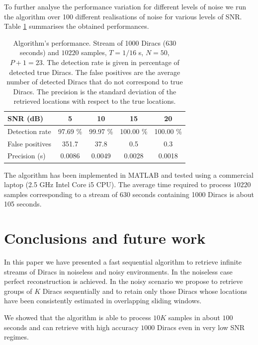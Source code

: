 \documentclass{article}
\begin{document}
To further analyse the performance variation for different levels
of noise we run the algorithm over 100 different realisations of noise
for various levels of SNR. Table \ref{tab:results} summarises the obtained performances.

\begin{table}[h!]
\caption{Algorithm's performance. Stream of 1000 Diracs (630 seconds) and $10220$ 
samples, $T = 1/16$ s, $N = 50$, $P+1=23$. 
The detection rate is given in percentage of detected true Diracs. The
false positives are the average number of detected Diracs that do not correspond to true Diracs.
The precision is the standard deviation of the retrieved locations with respect to the true locations.}
\label{tab:results}
\begin{center}
\footnotesize
\begin{tabular}{|l|c|c|c|c|}
\hline 
SNR (dB)                     & 5         & 10        & 15        &   20      \\
\hline
\hline
Detection rate               & 97.69 \%  & 99.97 \%  & 100.00 \% & 100.00 \% \\
\hline
False positives              & 351.7     & 37.8      & 0.5       & 0.3       \\
\hline
Precision (s)                & 0.0086    & 0.0049    & 0.0028    & 0.0018    \\
\hline
\end{tabular}
\end{center}
\end{table}

The algorithm has been implemented in MATLAB and tested using a commercial laptop 
(2.5 GHz Intel Core i5 CPU). The average time required to process $10220$ samples 
corresponding to a stream of 630 seconds
containing 1000 Diracs
is about 105 seconds. 


\section{Conclusions and future work}
\label{sec:conclusions}

In this paper we have presented a fast sequential algorithm to retrieve infinite streams
of Diracs in noiseless and noisy environments. 
In the noiseless case perfect reconstruction is achieved. In the noisy
scenario we propose to retrieve groups of $K$ Diracs sequentially and to retain only 
those Diracs whose locations have been consistently estimated in overlapping sliding windows.

We showed that the algorithm is able to process $10K$ samples in about $100$ seconds 
and can retrieve with high accuracy $1000$ Diracs even in very low SNR regimes.

\vfill\pagebreak

%




\end{document}
